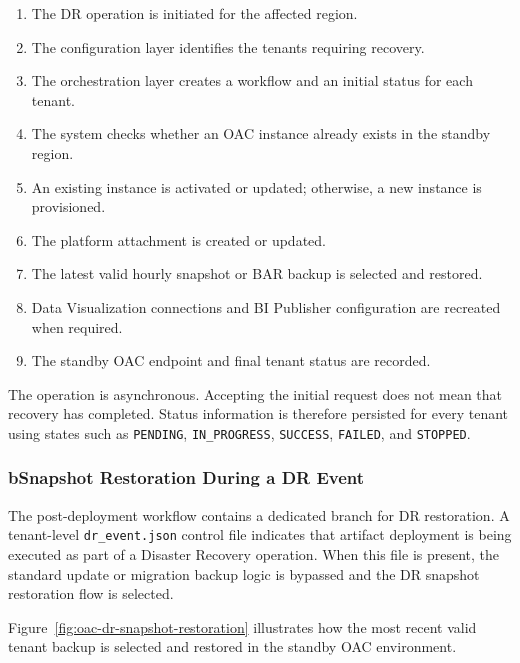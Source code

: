 \begin{enumerate}
    \item The DR operation is initiated for the affected region.
    \item The configuration layer identifies the tenants requiring recovery.
    \item The orchestration layer creates a workflow and an initial status for each tenant.
    \item The system checks whether an OAC instance already exists in the standby region.
    \item An existing instance is activated or updated; otherwise, a new instance is provisioned.
    \item The platform attachment is created or updated.
    \item The latest valid hourly snapshot or BAR backup is selected and restored.
    \item Data Visualization connections and BI Publisher configuration are recreated when required.
    \item The standby OAC endpoint and final tenant status are recorded.
\end{enumerate}

The operation is asynchronous. Accepting the initial request does not mean that recovery has completed. Status information is therefore persisted for every tenant using states such as \texttt{PENDING}, \texttt{IN\_PROGRESS}, \texttt{SUCCESS}, \texttt{FAILED}, and \texttt{STOPPED}.

\subsubsection*{b\quad Snapshot Restoration During a DR Event}

The post-deployment workflow contains a dedicated branch for DR restoration. A tenant-level \texttt{dr\_event.json} control file indicates that artifact deployment is being executed as part of a Disaster Recovery operation. When this file is present, the standard update or migration backup logic is bypassed and the DR snapshot restoration flow is selected.

Figure~\ref{fig:oac-dr-snapshot-restoration} illustrates how the most recent valid tenant backup is selected and restored in the standby OAC environment.

